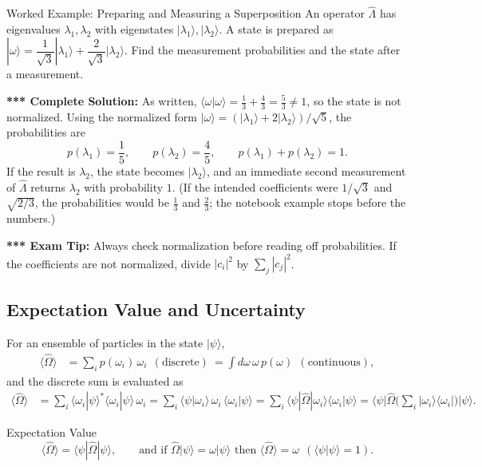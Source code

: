\documentclass[11pt,a4paper]{article}
\begin{document}
\begin{prob}{Worked Example: Preparing and Measuring a Superposition}
An operator $\hat\Lambda$ has eigenvalues $\lambda_1,\lambda_2$ with eigenstates $|\lambda_1\rangle,|\lambda_2\rangle$. A state is prepared as
$|\omega\rangle=\dfrac1{\sqrt3}|\lambda_1\rangle+\dfrac2{\sqrt3}|\lambda_2\rangle$.
Find the measurement probabilities and the state after a measurement.
\end{prob}
\textbf{*** Complete Solution:} As written, $\langle\omega|\omega\rangle=\tfrac13+\tfrac43=\tfrac53\neq1$, so the state is not normalized. Using the normalized form $|\omega\rangle=(|\lambda_1\rangle+2|\lambda_2\rangle)/\sqrt5$, the probabilities are
\[
p(\lambda_1)=\frac15,\qquad p(\lambda_2)=\frac45,\qquad p(\lambda_1)+p(\lambda_2)=1 .
\]
If the result is $\lambda_2$, the state becomes $|\lambda_2\rangle$, and an immediate second measurement of $\hat\Lambda$ returns $\lambda_2$ with probability $1$. (If the intended coefficients were $1/\sqrt3$ and $\sqrt{2/3}$, the probabilities would be $\tfrac13$ and $\tfrac23$; the notebook example stops before the numbers.)

\textbf{*** Exam Tip:} Always check normalization before reading off probabilities. If the coefficients are not normalized, divide $|c_i|^2$ by $\sum_j|c_j|^2$.

\subsection{Expectation Value and Uncertainty}
For an ensemble of particles in the state $|\psi\rangle$,
\begin{align*}
\langle\hat\Omega\rangle&=\sum_ip(\omega_i)\,\omega_i\ \ (\text{discrete})\ =\int d\omega\,\omega\,p(\omega)\ \ (\text{continuous}),
\end{align*}
and the discrete sum is evaluated as
\begin{align*}
\langle\hat\Omega\rangle&=\sum_i\langle\omega_i|\psi\rangle^*\langle\omega_i|\psi\rangle\,\omega_i
=\sum_i\langle\psi|\omega_i\rangle\,\omega_i\,\langle\omega_i|\psi\rangle
=\sum_i\langle\psi|\hat\Omega|\omega_i\rangle\langle\omega_i|\psi\rangle
=\langle\psi|\hat\Omega\Big(\sum_i|\omega_i\rangle\langle\omega_i|\Big)|\psi\rangle .
\end{align*}
\begin{thm}{Expectation Value}
\[
\langle\hat\Omega\rangle=\langle\psi|\hat\Omega|\psi\rangle,\qquad\text{and if }\hat\Omega|\psi\rangle=\omega|\psi\rangle\text{ then }\langle\hat\Omega\rangle=\omega\ \ (\langle\psi|\psi\rangle=1).
\]
\end{thm}
\end{document}
